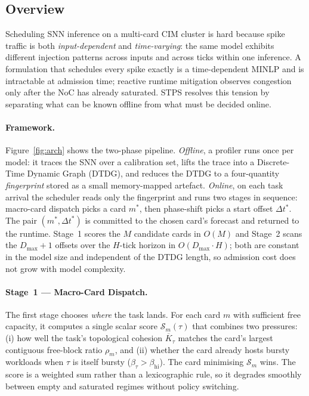 \documentclass[letterpaper,twocolumn,10pt]{article}
\begin{document}
\subsection{Overview}
\label{sec:design:overview}

Scheduling SNN inference on a multi-card CIM cluster is hard because spike traffic is both \emph{input-dependent} and \emph{time-varying}: the same model exhibits different injection patterns across inputs and across ticks within one inference. A formulation that schedules every spike exactly is a time-dependent MINLP and is intractable at admission time; reactive runtime mitigation observes congestion only after the NoC has already saturated. STPS resolves this tension by separating what can be known offline from what must be decided online.

\paragraph{Framework.} Figure~\ref{fig:arch} shows the two-phase pipeline. \emph{Offline}, a profiler runs once per model: it traces the SNN over a calibration set, lifts the trace into a Discrete-Time Dynamic Graph (DTDG), and reduces the DTDG to a four-quantity \emph{fingerprint} stored as a small memory-mapped artefact. \emph{Online}, on each task arrival the scheduler reads only the fingerprint and runs two stages in sequence: macro-card dispatch picks a card $m^{*}$, then phase-shift picks a start offset $\Delta t^{*}$. The pair $(m^{*}, \Delta t^{*})$ is committed to the chosen card's forecast and returned to the runtime. Stage~1 scores the $M$ candidate cards in $O(M)$ and Stage~2 scans the $D_{\max}{+}1$ offsets over the $H$-tick horizon in $O(D_{\max}\!\cdot\!H)$; both are constant in the model size and independent of the DTDG length, so admission cost does not grow with model complexity.

\paragraph{Stage~1 --- Macro-Card Dispatch.} The first stage chooses \emph{where} the task lands. For each card $m$ with sufficient free capacity, it computes a single scalar score $\mathcal{S}_m(\tau)$ that combines two pressures: (i) how well the task's topological cohesion $\overline{K}_\tau$ matches the card's largest contiguous free-block ratio $\rho_m$, and (ii) whether the card already hosts bursty workloads when $\tau$ is itself bursty ($\beta_\tau\!>\!\beta_{\mathrm{hi}}$). The card minimising $\mathcal{S}_m$ wins. The score is a weighted sum rather than a lexicographic rule, so it degrades smoothly between empty and saturated regimes without policy switching.
\end{document}
